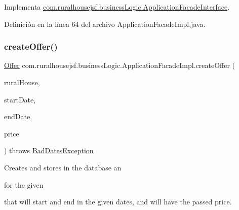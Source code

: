 Implementa \mbox{\hyperlink{interfacecom_1_1ruralhousejsf_1_1business_logic_1_1_application_facade_interface_a5a056a1b07c8ee83c1d540812b0a880d}{com.\+ruralhousejsf.\+business\+Logic.\+Application\+Facade\+Interface}}.



Definición en la línea 64 del archivo Application\+Facade\+Impl.\+java.

\mbox{\label{classcom_1_1ruralhousejsf_1_1business_logic_1_1_application_facade_impl_a9aafb2ac6e91d643bc5dd1f5691d4075}} 
\subsubsection{\texorpdfstring{createOffer()}{createOffer()}\hspace{0.1cm}{\footnotesize\ttfamily [2/2]}}
{\footnotesize\ttfamily \mbox{\hyperlink{classcom_1_1ruralhousejsf_1_1domain_1_1_offer}{Offer}} com.\+ruralhousejsf.\+business\+Logic.\+Application\+Facade\+Impl.\+create\+Offer (\begin{DoxyParamCaption}\item[{\mbox{\hyperlink{classcom_1_1ruralhousejsf_1_1domain_1_1_rural_house}{Rural\+House}}}]{rural\+House,  }\item[{Date}]{start\+Date,  }\item[{Date}]{end\+Date,  }\item[{double}]{price }\end{DoxyParamCaption}) throws \mbox{\hyperlink{classcom_1_1ruralhousejsf_1_1exceptions_1_1_bad_dates_exception}{Bad\+Dates\+Exception}}}

Creates and stores in the database an
\begin{DoxyCode}{0}
\end{DoxyCode}
 for the given
\begin{DoxyCode}{0}
\end{DoxyCode}
 that will start and end in the given dates, and will have the passed price.


